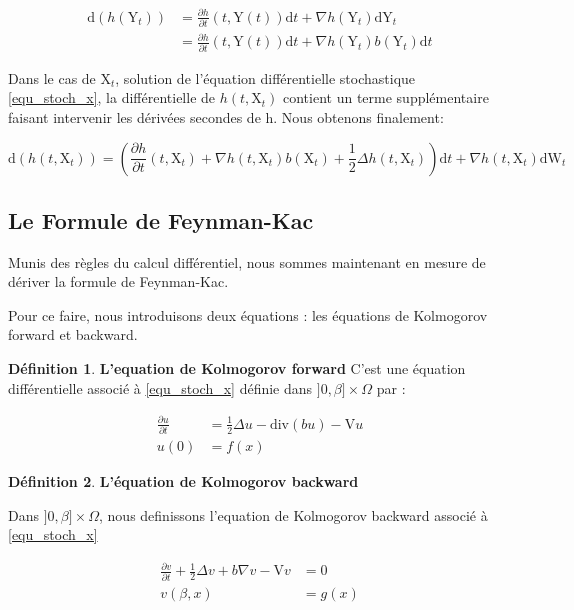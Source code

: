 \documentclass[11pt]{article}
\theoremstyle{definition}
\newtheorem{definition}{Définition}[section]
\theoremstyle{remark}
\begin{document}
\begin{align*}
\mathrm{d}(h(\mathrm{Y}_{t})) &= \frac{\partial h}{\partial t}(t,\mathrm{Y}(t)) \mathrm{d}t + \nabla h(\mathrm{Y}_{t}) \mathrm{dY}_{t} \\
&= \frac{\partial h}{\partial t}(t,\mathrm{Y}(t)) \mathrm{d}t + \nabla h(\mathrm{Y}_{t}) b(\mathrm{Y}_{t})\mathrm{d}t
\end{align*}

Dans le cas de $\mathrm{X}_{t}$, solution de l'équation différentielle stochastique \eqref{equ_stoch_x}, la différentielle de $h(t, \mathrm{X}_t)$ contient un terme supplémentaire faisant intervenir les dérivées secondes de h. Nous obtenons finalement:

\begin{equation}
\mathrm{d}(h(t,\mathrm{X}_t)) = ( \frac{\partial h}{\partial t}(t, \mathrm{X}_t) + \nabla h(t,\mathrm{X}_t) b(\mathrm{X}_t) + \frac{1}{2} \Delta h(t,\mathrm{X}_t) )\mathrm{d}t + \nabla h(t,\mathrm{X}_t) \mathrm{dW}_{t}
\end{equation}

\subsection{Le Formule de Feynman-Kac}

Munis des règles du calcul différentiel, nous sommes maintenant en mesure de dériver la formule de Feynman-Kac.

Pour ce faire, nous introduisons deux équations : les équations de Kolmogorov forward et backward.

\begin{definition}{\textbf{L'equation de Kolmogorov forward}}
C'est une équation différentielle associé à \eqref{equ_stoch_x} définie  dans $]0,\beta] \times \Omega$ par : 

\begin{equation}
\label{kolmo_forw}
\begin{split}
\frac{\partial u}{\partial t} &= \frac{1}{2} \Delta u - \mathrm{div}(bu) - \mathrm{V}u \\
u(0) &= f(x)
\end{split}
\end{equation}

\end{definition}



\begin{definition}{\textbf{L'équation de Kolmogorov backward}}

Dans $]0,\beta] \times \Omega$, nous definissons l'equation de Kolmogorov backward associé à \eqref{equ_stoch_x}

\begin{equation}
\label{kolmo_back}
\begin{split}
\frac{\partial v}{\partial t} + \frac{1}{2} \Delta v + b \nabla v - \mathrm{V}v &= 0 \\
v(\beta, x) &= g(x)
\end{split}
\end{equation}
\end{definition}
\end{document}
